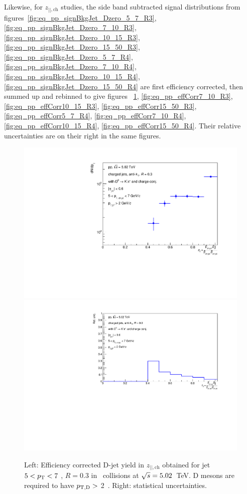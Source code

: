 Likewise, for $z_{||,\text{ch}}$ studies, the side band subtracted signal distributions from 
figures~\ref{fig:eq_pp_signBkgJet_Dzero_5_7_R3}, \ref{fig:eq_pp_signBkgJet_Dzero_7_10_R3}, \ref{fig:eq_pp_signBkgJet_Dzero_10_15_R3}, \ref{fig:eq_pp_signBkgJet_Dzero_15_50_R3}, \ref{fig:eq_pp_signBkgJet_Dzero_5_7_R4}, \ref{fig:eq_pp_signBkgJet_Dzero_7_10_R4}, \ref{fig:eq_pp_signBkgJet_Dzero_10_15_R4}, \ref{fig:eq_pp_signBkgJet_Dzero_15_50_R4} 
are first efficiency corrected, then summed up and rebinned to give figures~
\ref{fig:eq_pp_effCorr5_7_R3}, \ref{fig:eq_pp_effCorr7_10_R3}, \ref{fig:eq_pp_effCorr10_15_R3}, \ref{fig:eq_pp_effCorr15_50_R3}, 
\ref{fig:eq_pp_effCorr5_7_R4}, \ref{fig:eq_pp_effCorr7_10_R4}, \ref{fig:eq_pp_effCorr10_15_R4}, \ref{fig:eq_pp_effCorr15_50_R4}. 
Their relative uncertainties are on their right in the same figures.

\begin{figure}[bth]
\centering
\includegraphics[width=0.45\linewidth]{pp_2sig/R3_jetbin_5_7/jetPtSpectrum_SB_RebinProb_pTD2}
\includegraphics[width=0.45\linewidth]{pp_2sig/R3_jetbin_5_7/jetPtSpectrumUnc_SB_Rebin_pTD2}
\caption{Left: Efficiency corrected D-jet yield in $z_{||,\text{ch}}$ obtained for jet $5<p_{\text T}<7$ \GeVc, $R=0.3$ in \pp\ collisions at $\sqrt{s}=5.02$~TeV. D mesons are required to have $p_{\mathrm{T,D}}>$ 2~\GeVc. Right: statistical uncertainties.}
\label{fig:eq_pp_effCorr5_7_R3}
\end{figure}

